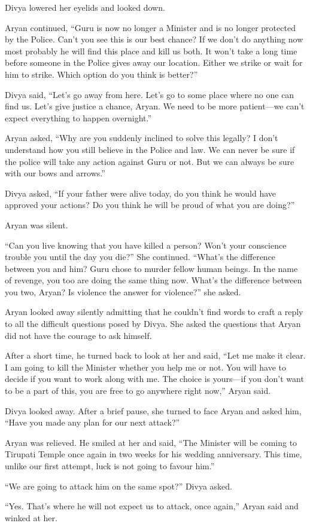 Divya lowered her eyelids and looked down.

Aryan continued, “Guru is now no longer a Minister and is no longer protected by
the Police. Can't you see this is our best chance? If we don't do anything now
most probably he will find this place and kill us both. It won't take a long
time before someone in the Police gives away our location. Either we strike or
wait for him to strike. Which option do you think is better?”

Divya said, “Let's go away from here. Let's go to some place where no one can
find us. Let's give justice a chance, Aryan. We need to be more patient—we
can't expect everything to happen overnight.”

Aryan asked, “Why are you suddenly inclined to solve this legally? I don't
understand how you still believe in the Police and law. We can never be sure if
the police will take any action against Guru or not. But we can always be sure
with our bows and arrows.”

Divya asked, “If your father were alive today, do you think he would have
approved your actions? Do you think he will be proud of what you are doing?”

Aryan was silent.

“Can you live knowing that you have killed a person? Won't your conscience
trouble you until the day you die?” She continued. “What's the difference
between you and him? Guru chose to murder fellow human beings. In the name of
revenge, you too are doing the same thing now. What's the difference between you
two, Aryan? Is violence the answer for violence?” she asked.

Aryan looked away silently admitting that he couldn't find words to craft a
reply to all the difficult questions posed by Divya. She asked the questions
that Aryan did not have the courage to ask himself.

After a short time, he turned back to look at her and said, “Let me make it
clear. I am going to kill the Minister whether you help me or not. You will have
to decide if you want to work along with me. The choice is yours—if you don't
want to be a part of this, you are free to go anywhere right now,” Aryan said.

Divya looked away. After a brief pause, she turned to face Aryan and asked him,
“Have you made any plan for our next attack?”

Aryan was relieved. He smiled at her and said, “The Minister will be coming to
Tirupati Temple once again in two weeks for his wedding anniversary. This time,
unlike our first attempt, luck is not going to favour him.”

“We are going to attack him on the same spot?” Divya asked.

“Yes. That's where he will not expect us to attack, once again,” Aryan said and
winked at her.
